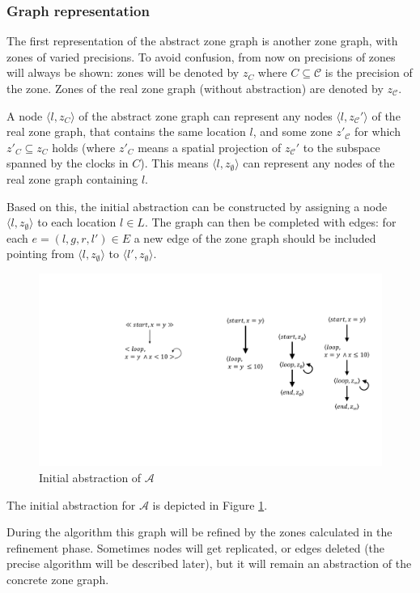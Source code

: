 \subsubsection{Graph representation}

The first representation of the abstract zone graph is another zone graph, with zones of varied precisions. To avoid confusion, from now on precisions of zones will always be shown: zones will be denoted by $z_{C}$ where $C \subseteq \mathcal{C}$ is the precision of the zone. Zones of the real zone graph (without abstraction) are denoted by $z_{\mathcal{C}}$.

A node $\langle l, z_{C} \rangle$ of the abstract zone graph can represent any nodes $\langle l, z_{\mathcal{C}}' \rangle$ of the real zone graph, that contains the same location $l$, and some zone $z'_{\mathcal{C}}$ for which $z'_C \subseteq z_C$ holds (where $z'_C$ means a spatial projection of $z_{\mathcal{C}}'$ to the subspace spanned by the clocks in $C$). This means $\langle l, z_{\emptyset} \rangle$ can represent any nodes of the real zone graph containing $l$. 

Based on this, the initial abstraction can be constructed by assigning a node $\langle l, z_{\emptyset} \rangle$ to each location $l \in L$. The graph can then be completed with edges: for each $e=(l,g,r,l') \in E$ a new edge of the zone graph should be included pointing from $\langle l, z_{\emptyset} \rangle$ to $\langle l', z_{\emptyset} \rangle$.

\begin{figure}
	\centering
	\includegraphics[width=.2\textwidth]{include/figures/graph_init}
	\caption{Initial abstraction of $\mathcal{A}$}
	\label{fig:graphinit}
\end{figure}

\begin{runningExample}
	The initial abstraction for $\mathcal{A}$ is depicted in Figure \ref{fig:graphinit}.
\end{runningExample}

During the algorithm this graph will be refined by the zones calculated in the refinement phase. Sometimes nodes will get replicated, or edges deleted (the precise algorithm will be described later), but it will remain  an abstraction of the concrete zone graph. 

